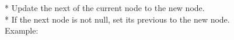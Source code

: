 \documentclass[preview]{standalone}
\begin{document}
*   Update the next of the current node to the new node.\\*   If the next node is not null, set its previous to the new node.\\Example:\\
\end{document}
